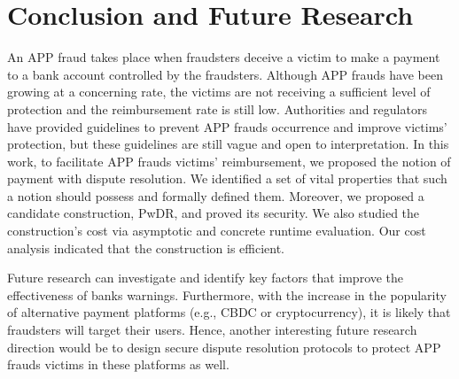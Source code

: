 
\section{Conclusion and Future Research}\label{sec::conclusion}


An APP fraud takes place when fraudsters deceive a victim to make a payment to a bank account controlled by the fraudsters. Although APP frauds have been growing at a concerning rate, the  victims are not receiving a sufficient level of protection and the reimbursement rate is still low. Authorities and regulators have  provided guidelines  to prevent APP frauds occurrence and improve victims’ protection, but these guidelines are still vague and open to interpretation. In this work, to facilitate APP frauds victims’ reimbursement,  we proposed the notion of payment with dispute resolution. We identified a set of vital properties that such a notion  should possess and formally defined them. Moreover,  we proposed a candidate construction, PwDR, and proved its security.  We also  studied the construction's cost via asymptotic and concrete runtime evaluation. Our cost analysis indicated that the construction is efficient. 



Future research can investigate and identify key factors that  improve the effectiveness of banks warnings.  Furthermore, with the increase in the popularity of  alternative payment platforms (e.g., CBDC or cryptocurrency), it is likely that  fraudsters will target their users. Hence, another interesting future research direction would be to design secure dispute resolution protocols  to protect  APP frauds victims in these platforms as well. 



